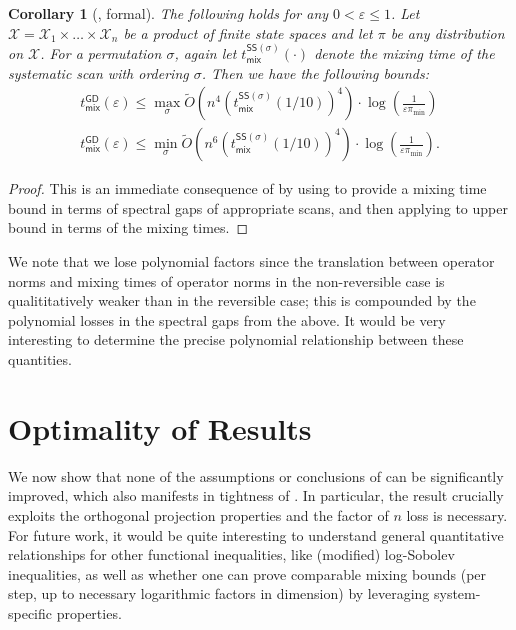 \documentclass[11pt]{article}
\newtheorem{corollary}{Corollary}[section]
\begin{document}
\begin{corollary}[, formal]
    The following holds for any $0<\varepsilon\leq 1$. Let $\mathcal{X}=\mathcal{X}_1\times \ldots\times \mathcal{X}_n$ be a product of finite state spaces and let $\pi$ be any distribution on $\mathcal{X}$. For a permutation $\sigma$, again let $t_{\mathsf{mix}}^{\mathsf{SS}(\sigma)}(\cdot)$ denote the mixing time of the systematic scan with ordering $\sigma$. Then we have the following bounds:
    \begin{gather*}
        t^{\mathsf{GD}}_{\mathsf{mix}}(\varepsilon)\leq \max_{\sigma}\widetilde{O}\left(n^4(t_{\mathsf{mix}}^{\mathsf{SS}(\sigma)}(1/10))^4\right)\cdot \log\left(\frac{1}{\varepsilon\pi_{\min}}\right)\\
        t^{\mathsf{GD}}_{\mathsf{mix}}(\varepsilon)\leq \min_{\sigma}\widetilde{O}\left(n^6(t_{\mathsf{mix}}^{\mathsf{SS}(\sigma)}(1/10))^4\right)\cdot \log\left(\frac{1}{\varepsilon\pi_{\min}}\right).
    \end{gather*}
\end{corollary}
\begin{proof}
    This is an immediate consequence of  by using  to provide a mixing time bound in terms of spectral gaps of appropriate scans, and then applying  to upper bound in terms of the mixing times.
\end{proof}

We note that we lose polynomial factors since the translation between operator norms and mixing times of operator norms in the non-reversible case is qualititatively weaker than in the reversible case; this is compounded by the polynomial losses in the spectral gaps from the above. It would be very interesting to determine the precise polynomial relationship between these quantities.


\section{Optimality of Results}
\label{sec:optimality}

We now show that none of the assumptions or conclusions of  can be significantly improved, which also manifests in tightness of . In particular, the result crucially exploits the orthogonal projection properties and the factor of $n$ loss is necessary. For future work, it would be quite interesting to understand general quantitative relationships for other functional inequalities, like (modified) log-Sobolev inequalities, as well as whether one can prove comparable mixing bounds (per step, up to necessary logarithmic factors in dimension) by leveraging system-specific properties.\\
\end{document}
